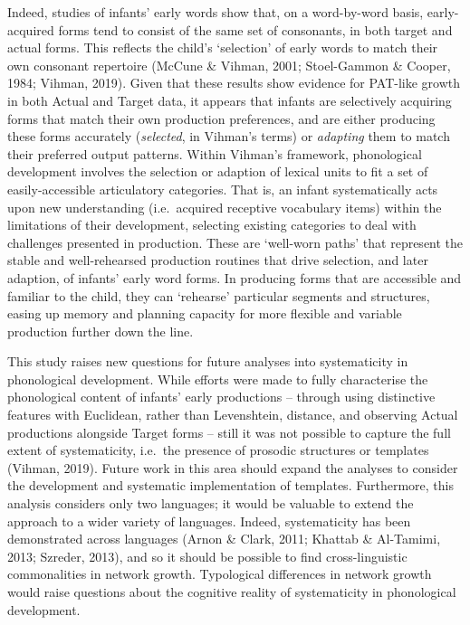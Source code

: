 \documentclass[
  man,mask,floatsintext]{apa6}
\begin{document}
Indeed, studies of infants' early words show that, on a word-by-word basis, early-acquired forms tend to consist of the same set of consonants, in both target and actual forms. This reflects the child's `selection' of early words to match their own consonant repertoire (McCune \& Vihman, 2001; Stoel-Gammon \& Cooper, 1984; Vihman, 2019). Given that these results show evidence for PAT-like growth in both Actual and Target data, it appears that infants are selectively acquiring forms that match their own production preferences, and are either producing these forms accurately (\emph{selected}, in Vihman's terms) or \emph{adapting} them to match their preferred output patterns. Within Vihman's framework, phonological development involves the selection or adaption of lexical units to fit a set of easily-accessible articulatory categories. That is, an infant systematically acts upon new understanding (i.e.~acquired receptive vocabulary items) within the limitations of their development, selecting existing categories to deal with challenges presented in production. These are `well-worn paths' that represent the stable and well-rehearsed production routines that drive selection, and later adaption, of infants' early word forms. In producing forms that are accessible and familiar to the child, they can `rehearse' particular segments and structures, easing up memory and planning capacity for more flexible and variable production further down the line.

This study raises new questions for future analyses into systematicity in phonological development. While efforts were made to fully characterise the phonological content of infants' early productions -- through using distinctive features with Euclidean, rather than Levenshtein, distance, and observing Actual productions alongside Target forms -- still it was not possible to capture the full extent of systematicity, i.e.~the presence of prosodic structures or templates (Vihman, 2019). Future work in this area should expand the analyses to consider the development and systematic implementation of templates. Furthermore, this analysis considers only two languages; it would be valuable to extend the approach to a wider variety of languages. Indeed, systematicity has been demonstrated across languages (Arnon \& Clark, 2011; Khattab \& Al-Tamimi, 2013; Szreder, 2013), and so it should be possible to find cross-linguistic commonalities in network growth. Typological differences in network growth would raise questions about the cognitive reality of systematicity in phonological development.
\end{document}
